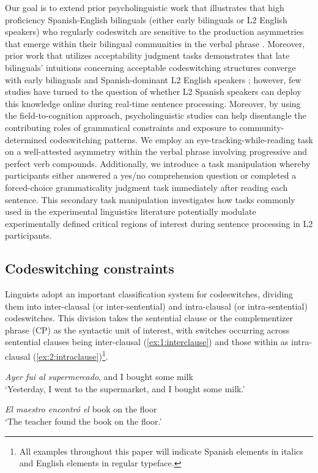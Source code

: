 \documentclass[output=paper,colorlinks,citecolor=brown]{langscibook}
\begin{document}
Our goal is to extend prior psycholinguistic work that illustrates that high proficiency Spanish-English bilinguals (either early bilinguals or L2 English speakers) who regularly codeswitch are sensitive to the production asymmetries that emerge within their bilingual communities in the verbal phrase \citep{GuzzardoTamargoetal2016}. Moreover, prior work that utilizes acceptability judgment tasks demonstrates that late bilinguals’ intuitions concerning acceptable codeswitching structures converge with early bilinguals and Spanish-dominant L2 English speakers \citep{Giancaspro2015,Toribio2001}; however, few studies have turned to the question of whether L2 Spanish speakers can deploy this knowledge online during real-time sentence processing. Moreover, by using the field-to-cognition approach, psycholinguistic studies can help disentangle the contributing roles of grammatical constraints and exposure to community-determined codeswitching patterns. We employ an eye-tracking-while-reading task on a well-attested asymmetry within the verbal phrase involving progressive and perfect verb compounds. Additionally, we introduce a task manipulation whereby participants either answered a yes/no comprehension question or completed a forced-choice grammaticality judgment task immediately after reading each sentence. This secondary task manipulation investigates how tasks commonly used in the experimental linguistics literature potentially modulate experimentally defined critical regions of interest during sentence processing in L2 participants.

\subsection{Codeswitching constraints}
Linguists adopt an important classification system for codeswitches, dividing them into inter-clausal (or inter-sentential) and intra-clausal (or intra-sentential) codeswitches. This division takes the sentential clause or the complementizer phrase (CP) as the syntactic unit of interest, with switches occurring across sentential clauses being inter-clausal (\ref{ex:1:interclause}) and those within as intra-clausal (\ref{ex:2:intraclause})\footnote{All examples throughout this paper will indicate Spanish elements in italics and English elements in regular typeface.}.

\begin{exe}
    \ex \label{ex:1:interclause}
    \textit{Ayer fui al supermercado}, and I bought some milk\\
    `Yesterday, I went to the supermarket, and I bought some milk.'

    \ex \label{ex:2:intraclause}
    \textit{El maestro encontr\'o el} book on the floor\\
    `The teacher found the book on the floor.'
\end{exe}
\end{document}

